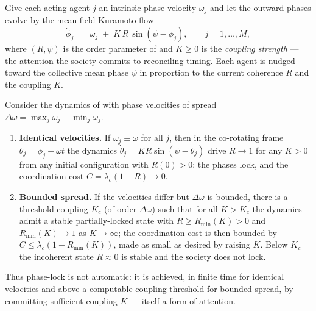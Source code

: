 \documentclass[11pt,twocolumn,a4paper]{article}
\newcommand{\Ord}{R}                 %
\newcommand{\phase}{\phi}
\begin{document}
\begin{definition}
\label{def:kuramoto}
Give each acting agent $j$ an intrinsic phase velocity $\omega_j$ and let
the outward phases evolve by the mean-field Kuramoto flow
\[
\dot{\phase}_j \;=\; \omega_j \;+\; K\,\Ord\,\sin(\psi-\phase_j),
\qquad j=1,\dots,M,
\]
where $(\Ord,\psi)$ is the order parameter of  and
$K\ge0$ is the \emph{coupling strength} --- the attention the society
commits to reconciling timing. Each agent is nudged toward the collective
mean phase $\psi$ in proportion to the current coherence $\Ord$ and the
coupling $K$.
\end{definition}

\begin{theorem}
\label{thm:kuramoto-lock}
Consider the dynamics of  with phase velocities of
spread $\Delta\omega=\max_j\omega_j-\min_j\omega_j$.
\begin{enumerate}[label=\textup{(\roman*)},leftmargin=2.2em]
\item \textbf{Identical velocities.} If $\omega_j\equiv\omega$ for all $j$,
then in the co-rotating frame $\theta_j=\phase_j-\omega t$ the dynamics
$\dot\theta_j=K\Ord\sin(\psi-\theta_j)$ drive $\Ord\to1$ for any $K>0$ from
any initial configuration with $\Ord(0)>0$: the phases lock, and the
coordination cost $C=\lambda_c(1-\Ord)\to0$.
\item \textbf{Bounded spread.} If the velocities differ but
$\Delta\omega$ is bounded, there is a threshold coupling
$K_c$ (of order $\Delta\omega$) such that for all $K>K_c$ the dynamics admit
a stable partially-locked state with $\Ord\ge\Ord_{\min}(K)>0$ and
$\Ord_{\min}(K)\to1$ as $K\to\infty$; the coordination cost is then bounded
by $C\le\lambda_c(1-\Ord_{\min}(K))$, made as small as desired by raising
$K$. Below $K_c$ the incoherent state $\Ord\approx0$ is stable and the
society does not lock.
\end{enumerate}
Thus phase-lock is not automatic: it is achieved, in finite time for
identical velocities and above a computable coupling threshold for bounded
spread, by committing sufficient coupling $K$ --- itself a form of attention.
\end{theorem}
\end{document}
